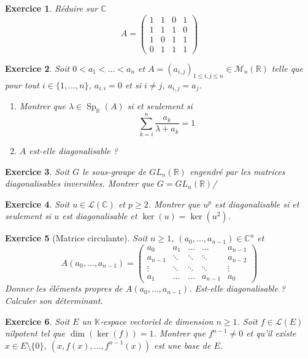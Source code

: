 \documentclass[12pt]{article}
\newtheorem{exercise}{Exercice}[section]
\theoremstyle{remark}
\theoremstyle{remark}
\newcommand{\K}{\mathbb{K}} \newcommand{\R}{\mathbb{R}}
\newcommand{\C}{\mathbb{C}} \newcommand{\Q}{\mathbb{Q}}
\newcommand{\M}{\mathcal{M}} \renewcommand{\L}{\mathcal{L}}
\DeclareMathOperator{\Sp}{Sp} \DeclareMathOperator{\mat}{mat}
\begin{document}
\begin{exercise}
	Réduire sur $\C$
	$$
	A=
	\begin{pmatrix}
		1 & 1 & 0 & 1\\
		1 & 1 & 1 & 0\\
		1 & 0 & 1 & 1\\
		0 & 1 & 1 & 1
	\end{pmatrix}
	$$
\end{exercise}

\begin{exercise}
	Soit $0<a_{1}<\dots<a_{n}$ et $A=(a_{i,j})_{1\leqslant i,j\leqslant n}\in\M_{n}(\R)$ telle que pour tout $i\in\{1,\dots,n\}$, $a_{i,i}=0$ et si $i\neq j$, $a_{i,j}=a_{j}$.
	\begin{enumerate}
		\item Montrer que $\lambda\in\Sp_{\R}(A)$ si et seulement si 
		$$\sum_{k=i}^{n}\frac{a_{k}}{\lambda+a_{k}}=1$$
		\item $A$ est-elle diagonalisable ?
	\end{enumerate}
\end{exercise}

\begin{exercise}
	Soit $G$ le sous-groupe de $GL_{n}(\R)$ engendré par les matrices diagonalisables inversibles. Montrer que $G=GL_{n}(\R)$/ 
\end{exercise}

\begin{exercise}
	Soit $u\in\L(\C)$ et $p\geqslant2$. Montrer que $u^{p}$ est diagonalisable si et seulement si $u$ est diagonalisable et $\ker(u)=\ker(u^{2})$.
\end{exercise}

\begin{exercise}[Matrice circulante]
	Soit $n\geqslant 1$, $(a_{0},\dots,a_{n-1})\in\C^{n}$ et 
	$$
	A(a_{0},\dots,a_{n-1})=
	\begin{pmatrix}
		a_{0} & a_{1} & \dots & \dots & a_{n-1}\\
		a_{n-1} & \ddots & \ddots & \ddots & a_{n-2}\\
		\vdots & \ddots & \ddots & \ddots & \vdots\\
		a_{1} & \dots & \dots & a_{n-1} & a_{0}
	\end{pmatrix}
	$$
	Donner les éléments propres de $A(a_{0},\dots,a_{n-1})$. Est-elle diagonalisable ? Calculer son déterminant.
\end{exercise}

\begin{exercise}
	Soit $E$ un $\K$-espace vectoriel de dimension $n\geqslant1$. Soit $f\in\L(E)$ nilpotent tel que $\dim(\ker(f))=1$. Montrer que $f^{n-1}\neq 0$ et qu'il existe $x\in E\setminus\{0\}$, $(x,f(x),\dots,f^{n-1}(x))$ est une base de $E$.
\end{exercise}
\end{document}
